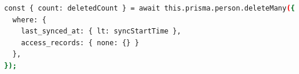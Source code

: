 \begin{minipage}{\textwidth}
\begin{lstlisting}[language=bash, caption={Logika Pembersihan Data pada \texttt{CronService}}, label={lst:logic_sweep}, frame=single, captionpos=t]
const { count: deletedCount } = await this.prisma.person.deleteMany({
  where: { 
    last_synced_at: { lt: syncStartTime },
    access_records: { none: {} }
  },
});
\end{lstlisting}
\end{minipage}